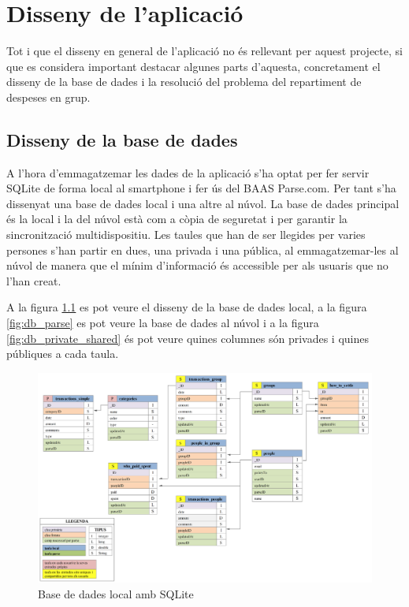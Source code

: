 \chapter{Disseny de l'aplicació}
Tot i que el disseny en general de l'aplicació no és rellevant per aquest projecte, si que es considera important destacar algunes parts d'aquesta, concretament el disseny de la base de dades i la resolució del problema del repartiment de despeses en grup.



\section{Disseny de la base de dades}
A l'hora d'emmagatzemar les dades de la aplicació s'ha optat per fer servir \gls{SQLite} de forma local al \gls{smartphone} i fer ús del \gls{BAAS} Parse.com. Per tant s'ha dissenyat una base de dades local i una altre al núvol. La base de dades principal és la local i la del núvol està com a còpia de seguretat i per garantir la sincronització multidispositiu. Les taules que han de ser llegides per varies persones s'han partir en dues, una privada i una pública, al emmagatzemar-les al núvol de manera que el mínim d'informació és accessible per als usuaris que no l'han creat.

A la figura \ref{fig:db_sqlite} es pot veure el disseny de la base de dades local, a la figura \ref{fig:db_parse} es pot veure la base de dades al núvol i a la figura \ref{fig:db_private_shared} és pot veure quines columnes són privades i quines públiques a cada taula. 

\begin{figure}[ht]
\centering
\includegraphics[scale=0.44]{db_sqlite.png}
\caption{Base de dades local amb SQLite}\label{fig:db_sqlite}
\end{figure}

